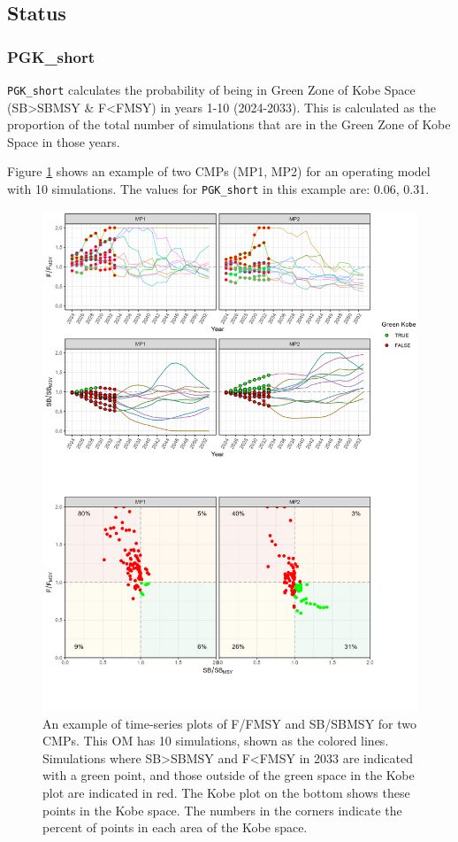\documentclass[
]{article}
\begin{document}
\hypertarget{status}{%
\subsection{Status}\label{status}}

\hypertarget{pgk_short}{%
\subsubsection{PGK\_short}\label{pgk_short}}

\texttt{PGK\_short} calculates the probability of being in Green Zone of Kobe Space (SB\textgreater SBMSY \& F\textless FMSY) in years 1-10 (2024-2033). This is calculated as the proportion of the total number of simulations that are in the Green Zone of Kobe Space in those years.

Figure \ref{fig:PGKshort} shows an example of two CMPs (MP1, MP2) for an operating model with 10 simulations. The values for \texttt{PGK\_short} in this example are: 0.06, 0.31.

\begin{figure}
\includegraphics[width=37.5in]{../../img/PMs/PGK_short} \caption{An example of time-series plots of F/FMSY and SB/SBMSY for two CMPs. This OM has 10 simulations, shown as the colored lines. Simulations where SB>SBMSY and F<FMSY in 2033 are indicated with a green point, and those outside of the green space in the Kobe plot are indicated in red. The Kobe plot on the bottom shows these points in the Kobe space. The numbers in the corners indicate the percent of points in each area of the Kobe space.}\label{fig:PGKshort}
\end{figure}
\end{document}
